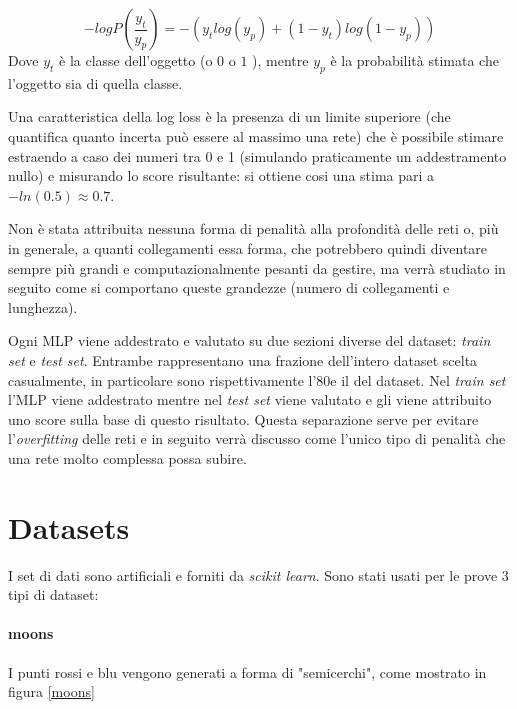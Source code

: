 \documentclass[12pt,a4paper]{report}
\begin{document}
\begin{equation}
 -log P(\frac{y_{t}}{y_{p}}) = -(y_{t} log(y_{p}) + (1 - y_{t}) log(1 - y_{p}))
\end{equation}
Dove $y_{t}$ è la classe dell'oggetto (o $0$ o $1$ ), mentre $y_{p}$ è la probabilità stimata che l'oggetto sia di quella classe.

Una caratteristica della log loss è la presenza di un limite superiore (che quantifica quanto incerta può essere al massimo una rete) che è possibile stimare estraendo a caso dei numeri tra 0 e 1 (simulando praticamente un addestramento nullo) e misurando lo score risultante: si ottiene cosi una stima pari a  $-ln(0.5) \approx 0.7$.

Non è stata attribuita nessuna forma di penalità alla profondità delle reti o, più in generale, a quanti collegamenti essa forma, che potrebbero quindi diventare sempre più grandi e computazionalmente pesanti da gestire, ma verrà studiato in seguito come si comportano queste grandezze (numero di collegamenti e lunghezza). 

Ogni MLP viene addestrato e valutato su due sezioni diverse del dataset: \textit{train set} e \textit{test set}.
Entrambe rappresentano una frazione dell'intero dataset scelta casualmente, in particolare sono rispettivamente l'80\textdiscount e il \textdiscount del dataset.
Nel \textit{train set} l'MLP viene addestrato mentre nel \textit{test set} viene valutato e gli viene attribuito uno score sulla base di questo risultato. 
Questa separazione serve per evitare l'\textit{overfitting} delle reti e in seguito verrà discusso come l'unico tipo di penalità che una rete molto complessa possa subire.

\section{Datasets}

I set di dati sono artificiali e forniti da \textit{scikit learn}. 
Sono stati usati per le prove 3 tipi di dataset:

\paragraph{moons} I punti rossi e blu vengono generati a forma di "semicerchi", come mostrato in figura \ref{moons} 
\end{document}
